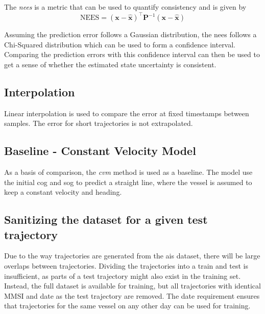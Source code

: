 The \textit{\acrfull{nees}} is a metric that can be used to quantify consistency and is given by 
\begin{equation}
    \text{NEES} = (\boldsymbol{x} - \hat{\boldsymbol{x}})^\intercal \boldsymbol{P}^{-1} (\boldsymbol{x} - \hat{\boldsymbol{x}})
\end{equation}

Assuming the prediction error follows a Gaussian distribution, the \acrshort{nees} follows a Chi-Squared distribution which can be used to form a confidence interval. Comparing the prediction errors with this confidence interval can then be used to get a sense of whether the estimated state uncertainty is consistent. 

\subsection{Interpolation}
Linear interpolation is used to compare the error at fixed timestamps between samples. The error for short trajectories is not extrapolated.

\subsection{Baseline - Constant Velocity Model}
As a basis of comparison, the \textit{\acrfull{cvm}} method is used as a baseline. The model use the initial \acrshort{cog} and \acrshort{sog} to predict a straight line, where the vessel is assumed to keep a constant velocity and heading. 

\subsection{Sanitizing the dataset for a given test trajectory}
Due to the way trajectories are generated from the \acrshort{ais} dataset, there will be large overlaps between trajectories. Dividing the trajectories into a train and test is insufficient, as parts of a test trajectory might also exist in the training set. Instead, the full dataset is available for training, but all trajectories with identical MMSI and date as the test trajectory are removed. The date requirement ensures that trajectories for the same vessel on any other day can be used for training.

